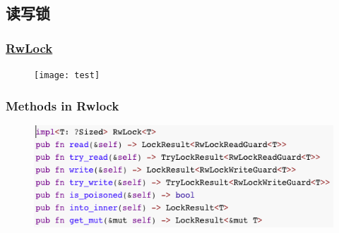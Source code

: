\subsection{读写锁} %
\begin{frame}[fragile]
    \frametitle{\href{https://doc.rust-lang.org/std/sync/struct.RwLock.html}{RwLock}}
    \begin{figure}
    \texttt{[image: test]}
    \end{figure}

\end{frame}
% 
% 
% 
% 
\begin{frame}[fragile]
    \frametitle{Methods in Rwlock}
    \begin{figure}
    \includegraphics[width=0.8\linewidth]{figs/methods-rwlock.png}
    \end{figure}

\end{frame}
% 
% 

